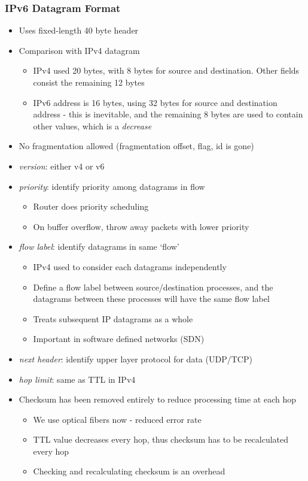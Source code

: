 \subsubsection{IPv6 Datagram Format}
\begin{itemize}
	\item Uses fixed-length 40 byte header
	\item Comparison with IPv4 datagram
	\begin{itemize}
		\item IPv4 used 20 bytes, with 8 bytes for source and destination. Other fields consist the remaining 12 bytes
		\item IPv6 address is 16 bytes, using 32 bytes for source and destination address - this is inevitable, and the remaining 8 bytes are used to contain other values, which is a \textit{decrease}
	\end{itemize}
	\item No fragmentation allowed (fragmentation offset, flag, id is gone)
	\item \textit{version}: either v4 or v6
	\item \textit{priority}: identify priority among datagrams in flow
	\begin{itemize}
		\item Router does priority scheduling
		\item On buffer overflow, throw away packets with lower priority
	\end{itemize}
	\item \textit{flow label}: identify datagrams in same `flow'
	\begin{itemize}
		\item IPv4 used to consider each datagrams independently
		\item Define a flow label between source/destination processes, and the datagrams between these processes will have the same flow label
		\item Treats subsequent IP datagrams as a whole
		\item Important in software defined networks (SDN)
	\end{itemize}
	\item \textit{next header}: identify upper layer protocol for data (UDP/TCP)
	\item \textit{hop limit}: same as TTL in IPv4
	\item Checksum has been removed entirely to reduce processing time at each hop
	\begin{itemize}
		\item We use optical fibers now - reduced error rate
		\item TTL value decreases every hop, thus checksum has to be recalculated every hop
		\item Checking and recalculating checksum is an overhead
	\end{itemize}
\end{itemize}

